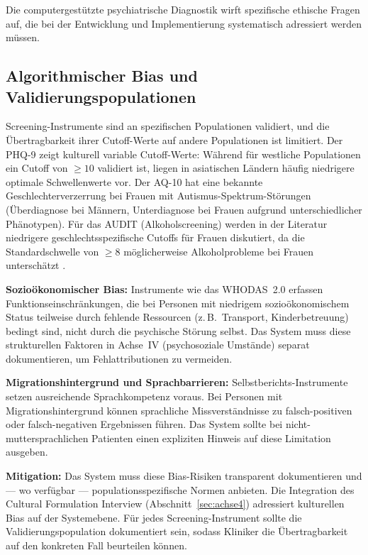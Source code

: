 \documentclass[11pt,a4paper]{article}
\begin{document}
Die computergest\"utzte psychiatrische Diagnostik wirft spezifische ethische Fragen auf, die bei der Entwicklung und Implementierung systematisch adressiert werden m\"ussen.

\subsection{Algorithmischer Bias und Validierungspopulationen}

Screening-Instrumente sind an spezifischen Populationen validiert, und die \"Ubertragbarkeit ihrer Cutoff-Werte auf andere Populationen ist limitiert. Der PHQ-9 zeigt kulturell variable Cutoff-Werte: W\"ahrend f\"ur westliche Populationen ein Cutoff von $\geq 10$ validiert ist, liegen in asiatischen L\"andern h\"aufig niedrigere optimale Schwellenwerte vor. Der AQ-10 hat eine bekannte Geschlechterverzerrung bei Frauen mit Autismus-Spektrum-St\"orungen (\"Uberdiagnose bei M\"annern, Unterdiagnose bei Frauen aufgrund unterschiedlicher Ph\"anotypen). F\"ur das AUDIT (Alkoholscreening) werden in der Literatur niedrigere geschlechtsspezifische Cutoffs f\"ur Frauen diskutiert, da die Standardschwelle von $\geq 8$ m\"oglicherweise Alkoholprobleme bei Frauen untersch\"atzt \citep{Saunders1993}.

\textbf{Sozio\"okonomischer Bias:} Instrumente wie das WHODAS~2.0 erfassen Funktionseinschr\"ankungen, die bei Personen mit niedrigem sozio\"okonomischem Status teilweise durch fehlende Ressourcen (z.\,B.\ Transport, Kinderbetreuung) bedingt sind, nicht durch die psychische St\"orung selbst. Das System muss diese strukturellen Faktoren in Achse~IV (psychosoziale Umst\"ande) separat dokumentieren, um Fehlattributionen zu vermeiden.

\textbf{Migrationshintergrund und Sprachbarrieren:} Selbstberichts-Instrumente setzen ausreichende Sprachkompetenz voraus. Bei Personen mit Migrationshintergrund k\"onnen sprachliche Missverst\"andnisse zu falsch-positiven oder falsch-negativen Ergebnissen f\"uhren. Das System sollte bei nicht-muttersprachlichen Patienten einen expliziten Hinweis auf diese Limitation ausgeben.

\textbf{Mitigation:} Das System muss diese Bias-Risiken transparent dokumentieren und --- wo verf\"ugbar --- populationsspezifische Normen anbieten. Die Integration des Cultural Formulation Interview (Abschnitt~\ref{sec:achse4}) adressiert kulturellen Bias auf der Systemebene. F\"ur jedes Screening-Instrument sollte die Validierungspopulation dokumentiert sein, sodass Kliniker die \"Ubertragbarkeit auf den konkreten Fall beurteilen k\"onnen.
\end{document}
